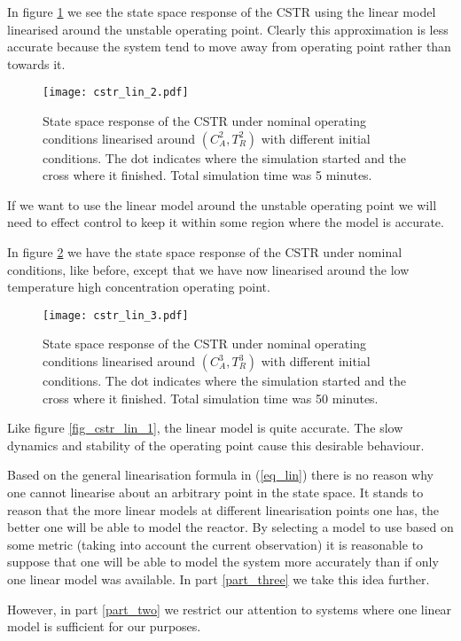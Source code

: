 In figure \ref{fig_cstr_lin_2} we see the state space response of the CSTR using the linear model linearised around the unstable operating point. Clearly this approximation is less accurate because the system tend to move away from operating point rather than towards it. 
\begin{figure}[H] 
\centering
\texttt{[image: cstr\_lin\_2.pdf]}
\caption{State space response of the CSTR under nominal operating conditions linearised around $(C_A^2,T_R^2)$ with different initial conditions. The dot indicates where the simulation started and the cross where it finished. Total simulation time was 5 minutes.}
\label{fig_cstr_lin_2}
\end{figure}
If we want to use the linear model around the unstable operating point we will need to effect control to keep it within some region where the model is accurate.

In figure \ref{fig_cstr_lin_3} we have the state space response of the CSTR under nominal conditions, like before, except that we have now linearised around the low temperature high concentration operating point. 
\begin{figure}[H] 
\centering
\texttt{[image: cstr\_lin\_3.pdf]}
\caption{State space response of the CSTR under nominal operating conditions linearised around $(C_A^3,T_R^3)$ with different initial conditions. The dot indicates where the simulation started and the cross where it finished. Total simulation time was 50 minutes.}
\label{fig_cstr_lin_3}
\end{figure}
Like figure \ref{fig_cstr_lin_1}, the linear model is quite accurate. The slow dynamics and stability of the operating point cause this desirable behaviour.

Based on the general linearisation formula in (\ref{eq_lin}) there is no reason why one cannot linearise about an arbitrary point in the state space. It stands to reason that the more linear models at different linearisation points one has, the better one will be able to model the reactor. By selecting a model to use based on some metric (taking into account the current observation) it is reasonable to suppose that one will be able to model the system more accurately than if only one linear model was available. In part \ref{part_three} we take this idea further.

However, in part \ref{part_two} we restrict our attention to systems where one linear model is sufficient for our purposes.  